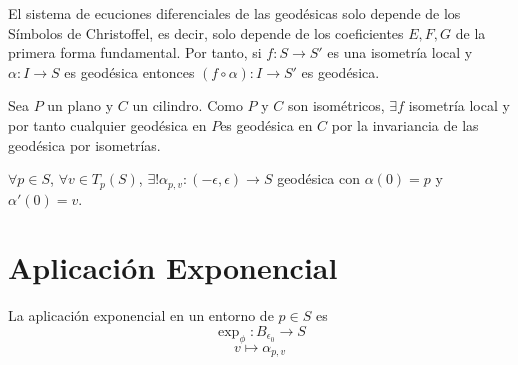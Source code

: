 \begin{prop}
  El sistema de ecuciones diferenciales de las geodésicas solo depende de los Símbolos de Christoffel, es decir, solo depende de los coeficientes $E, F, G$ de la primera forma fundamental. Por tanto, si $f : S \to S'$ es una isometría local y $\alpha : I \to S$ es geodésica entonces $(f \circ \alpha) : I \to S'$ es geodésica.
\end{prop}

\begin{ejm}
  Sea $P$ un plano y $C$ un cilindro. Como $P$ y $C$ son isométricos, $\exists f$ isometría local y por tanto cualquier geodésica en $P$es geodésica en $C$ por la invariancia de las geodésica por isometrías.
\end{ejm}

\begin{prop}
  $\forall p \in S$, $\forall v \in T_{p}(S)$, $\exists! \alpha_{p, v} : (-\epsilon, \epsilon) \to S$  geodésica con $\alpha(0) = p$ y $\alpha'(0) = v$.
\end{prop}

\section{Aplicación Exponencial}

\begin{defn}
  La aplicación exponencial en un entorno de $p \in S$ es
  \[ 
    \exp_{\phi} : B_{\epsilon_{0}} \to  S
  \] 
  \[ 
    v \mapsto \alpha_{p, v} 
  \] 
\end{defn}

